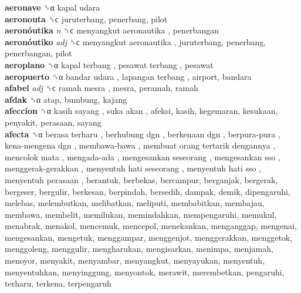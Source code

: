 \textbf{aeronave} ␝α   kapal udara   \\
\textbf{aeronouta} ␝ϲ  juruterbang, penerbang, pilot  \\
\textbf{aeronóutika} \emph{n}  ␝ϲ   menyangkut aeronautika , penerbangan  \\
\textbf{aeronóutiko} \emph{adj}  ␝ϲ   menyangkut aeronautika , juruterbang, penerbang, penerbangan, pilot  \\
\textbf{aeroplano} ␝α   kapal terbang ,  pesawat terbang , pesawat  \\
\textbf{aeropuerto} ␝α   bandar udara ,  lapangan terbang , airport, bandara  \\
\textbf{afabel} \emph{adj}  ␝ϲ   ramah mesra , mesra, peramah, ramah  \\
\textbf{afdak} ␝α  atap, bumbung, kajang  \\
\textbf{afeccion} ␝α   kasih sayang ,  suka akan , afeksi, kasih, kegemaran, kesukaan, penyakit, perasaan, sayang  \\
\textbf{afecta} ␝α   berasa terharu ,  berhubung dgn ,  berkenaan dgn ,  berpura-pura ,  kena-mengena dgn ,  membawa-bawa ,  membuat orang tertarik dengannya ,  mencolok mata ,  mengada-ada ,  mengesankan seseorang ,  mengesankan sso ,  menggerak-gerakkan ,  menyentuh hati seseorang ,  menyentuh hati sso ,  menyentuh perasaan , berantuk, berbekas, bercampur, berganjak, bergerak, bergeser, bergulir, berkesan, berpindah, bersedih, dampak, demik, dipengaruhi, melebas, melembutkan, melibatkan, meliputi, membabitkan, membajau, membawa, membelit, memilukan, memindahkan, mempengaruhi, memukul, menabrak, menakol, mencemuk, mencepol, menekankan, menganggap, mengenai, mengesankan, mengetuk, menggampar, menggenjot, menggerakkan, menggetok, menggoleng, menggulir, mengharukan, mengisarkan, menimpa, menjamah, menoyor, menyakit, menyambar, menyangkut, menyayukan, menyentuh, menyentuhkan, menyinggung, menyontok, merawit, merembetkan, pengaruhi, terharu, terkena, terpengaruh  \\
